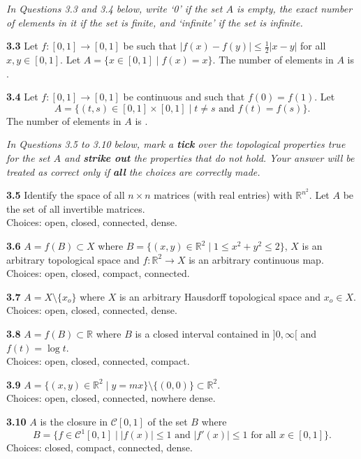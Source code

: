 \documentclass[11pt,a4paper]{article}
\newcommand{\R}{\mathbb{R}}
\newcommand{\qitem}[1]{\par\medskip\noindent\textbf{#1}\hspace{0.5em}}
\begin{document}
\medskip
\noindent\emph{In Questions 3.3 and 3.4 below, write `0' if the set $A$ is empty, the exact number of elements in it if the set is finite, and `infinite' if the set is infinite.}

\qitem{3.3} Let $f : [0, 1] \to [0, 1]$ be such that $|f(x) - f(y)| \le \frac{1}{2}|x - y|$ for all $x, y \in [0, 1]$. Let $A = \{x \in [0, 1] \mid f(x) = x\}$. The number of elements in $A$ is \underline{\hspace{2cm}}.

\qitem{3.4} Let $f : [0, 1] \to [0, 1]$ be continuous and such that $f(0) = f(1)$. Let
\[
  A = \{(t, s) \in [0, 1] \times [0, 1] \mid t \neq s \text{ and } f(t) = f(s)\}.
\]
The number of elements in $A$ is \underline{\hspace{2cm}}.

\medskip
\noindent\emph{In Questions 3.5 to 3.10 below, mark a \textbf{tick} over the topological properties true for the set $A$ and \textbf{strike out} the properties that do not hold. Your answer will be treated as correct only if \textbf{all} the choices are correctly made.}

\qitem{3.5} Identify the space of all $n \times n$ matrices (with real entries) with $\R^{n^2}$. Let $A$ be the set of all invertible matrices.\\
Choices: open, closed, connected, dense.

\qitem{3.6} $A = f(B) \subset X$ where $B = \{(x, y) \in \R^2 \mid 1 \le x^2 + y^2 \le 2\}$, $X$ is an arbitrary topological space and $f : \R^2 \to X$ is an arbitrary continuous map.\\
Choices: open, closed, compact, connected.

\qitem{3.7} $A = X \setminus \{x_o\}$ where $X$ is an arbitrary Hausdorff topological space and $x_o \in X$.\\
Choices: open, closed, connected, dense.

\qitem{3.8} $A = f(B) \subset \R$ where $B$ is a closed interval contained in $]0, \infty[$ and $f(t) = \log t$.\\
Choices: open, closed, connected, compact.

\qitem{3.9} $A = \{(x, y) \in \R^2 \mid y = mx\} \setminus \{(0, 0)\} \subset \R^2$.\\
Choices: open, closed, connected, nowhere dense.

\qitem{3.10} $A$ is the closure in $\mathcal{C}[0, 1]$ of the set $B$ where
\[
  B = \{f \in \mathcal{C}^1[0, 1] \mid |f(x)| \le 1 \text{ and } |f'(x)| \le 1 \text{ for all } x \in [0, 1]\}.
\]
Choices: closed, compact, connected, dense.
\end{document}
